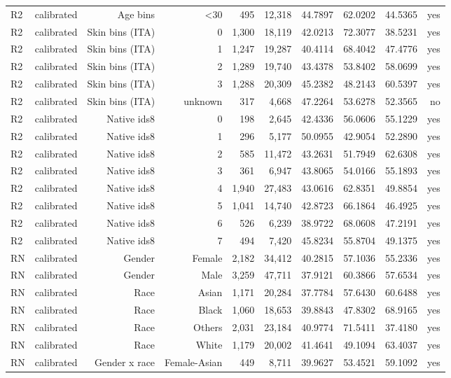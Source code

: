 \documentclass[10pt]{article}
\begin{document}
\begin{longtable}{@{}lrrrrrrrrr@{}}
R2 & calibrated & Age bins & \textless{}30 & 495 & 12,318 & 44.7897 & 62.0202 & 44.5365 & yes \\
R2 & calibrated & Skin bins (ITA) & 0 & 1,300 & 18,119 & 42.0213 & 72.3077 & 38.5231 & yes \\
R2 & calibrated & Skin bins (ITA) & 1 & 1,247 & 19,287 & 40.4114 & 68.4042 & 47.4776 & yes \\
R2 & calibrated & Skin bins (ITA) & 2 & 1,289 & 19,740 & 43.4378 & 53.8402 & 58.0699 & yes \\
R2 & calibrated & Skin bins (ITA) & 3 & 1,288 & 20,309 & 45.2382 & 48.2143 & 60.5397 & yes \\
R2 & calibrated & Skin bins (ITA) & unknown & 317 & 4,668 & 47.2264 & 53.6278 & 52.3565 & no \\
R2 & calibrated & Native ids8 & 0 & 198 & 2,645 & 42.4336 & 56.0606 & 55.1229 & yes \\
R2 & calibrated & Native ids8 & 1 & 296 & 5,177 & 50.0955 & 42.9054 & 52.2890 & yes \\
R2 & calibrated & Native ids8 & 2 & 585 & 11,472 & 43.2631 & 51.7949 & 62.6308 & yes \\
R2 & calibrated & Native ids8 & 3 & 361 & 6,947 & 43.8065 & 54.0166 & 55.1893 & yes \\
R2 & calibrated & Native ids8 & 4 & 1,940 & 27,483 & 43.0616 & 62.8351 & 49.8854 & yes \\
R2 & calibrated & Native ids8 & 5 & 1,041 & 14,740 & 42.8723 & 66.1864 & 46.4925 & yes \\
R2 & calibrated & Native ids8 & 6 & 526 & 6,239 & 38.9722 & 68.0608 & 47.2191 & yes \\
R2 & calibrated & Native ids8 & 7 & 494 & 7,420 & 45.8234 & 55.8704 & 49.1375 & yes \\
RN & calibrated & Gender & Female & 2,182 & 34,412 & 40.2815 & 57.1036 & 55.2336 & yes \\
RN & calibrated & Gender & Male & 3,259 & 47,711 & 37.9121 & 60.3866 & 57.6534 & yes \\
RN & calibrated & Race & Asian & 1,171 & 20,284 & 37.7784 & 57.6430 & 60.6488 & yes \\
RN & calibrated & Race & Black & 1,060 & 18,653 & 39.8843 & 47.8302 & 68.9165 & yes \\
RN & calibrated & Race & Others & 2,031 & 23,184 & 40.9774 & 71.5411 & 37.4180 & yes \\
RN & calibrated & Race & White & 1,179 & 20,002 & 41.4641 & 49.1094 & 63.4037 & yes \\
RN & calibrated & Gender x race & Female-Asian & 449 & 8,711 & 39.9627 & 53.4521 & 59.1092 & yes \\

\end{longtable}
\end{document}

